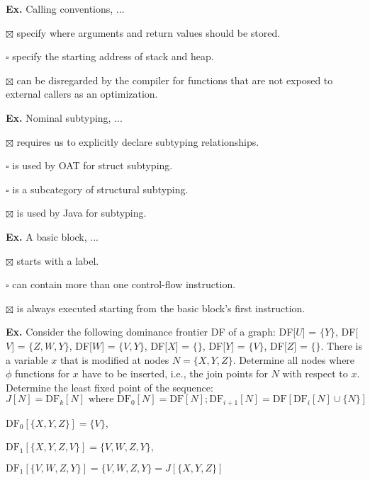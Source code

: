 \hrulefill

\textbf{Ex.} Calling conventions, ...
\begin{compactitem}[$\quad\bullet$]
	\item[$\boxtimes$] specify where arguments and return values should be stored.
	\item[$\square$] specify the starting address of stack and heap.
	\item[$\boxtimes$] can be disregarded by the compiler for functions that are not exposed to external callers as an optimization.
\end{compactitem}

\hrulefill

\textbf{Ex.} Nominal subtyping, ...
\begin{compactitem}[$\quad\bullet$]
	\item[$\boxtimes$] requires us to explicitly declare subtyping relationships.
	\item[$\square$] is used by OAT for struct subtyping.
	\item[$\square$] is a subcategory of structural subtyping.
	\item[$\boxtimes$] is used by Java for subtyping.
\end{compactitem}

\hrulefill

\textbf{Ex.} A basic block, ...
\begin{compactitem}[$\quad\bullet$]
	\item[$\boxtimes$] starts with a label.
	\item[$\square$] can contain more than one control-flow instruction.
	\item[$\boxtimes$] is always executed starting from the basic block's first instruction.
\end{compactitem}

\hrulefill

\textbf{Ex.} Consider the following dominance frontier DF of a graph:
DF[$ U $] = $\{ Y \}$,
DF[$ V $] = $\{ Z, W, Y \}$,
DF[$ W $] = $\{ V, Y \}$,
DF[$ X $] = $\{  \}$,
DF[$ Y $] = $\{ V \}$,
DF[$ Z $] = $\{  \}$.
There is a variable $x$ that is modified at nodes $N = \{X, Y, Z\}$. Determine all nodes
where $\phi$ functions for $x$ have to be inserted, i.e., the join points for $N$ with respect to $x$.
Determine the least fixed point of the sequence:
$$J[N] = \text{DF}_k[N] \text{ where } \text{DF}_0[N] = \text{DF}[N]; \text{DF}_{i+1}[N] = \text{DF}[\text{DF}_i[N] \cup \{N\}]$$\smallskip

$\text{DF}_0[\{X, Y, Z\}] = \{V\}$,

$\text{DF}_1[\{X, Y, Z, V\}] = \{V, W, Z, Y\}$,

$\text{DF}_1[\{V, W, Z, Y\}] = \{V, W, Z, Y\} = J[\{X, Y, Z\}]$

\hrulefill
